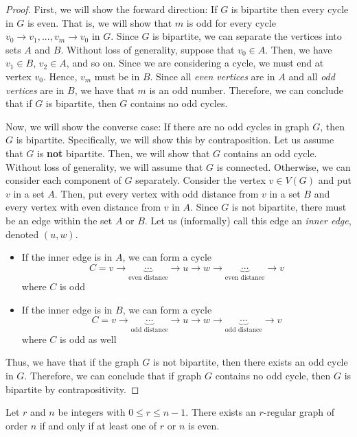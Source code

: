\begin{proof}
  First, we will show the forward direction: If \(G\) is bipartite then
  every cycle in \(G\) is even. That is, we will show that
  \(m\) is odd for every cycle \(v_0 \to
  v_1, ..., v_m \to v_0\) in \(G\). Since \(G\) is bipartite, we can separate
  the vertices into sets \(A\) and \(B\). Without loss of generality, suppose
  that \(v_0 \in A\). Then, we have \(v_1 \in B\), \(v_2 \in A\), and so on.
  Since we are considering a cycle, we must end at vertex \(v_0\). Hence,
  \(v_m\) must be in \(B\). Since all \textit{even vertices} are in \(A\) and all \textit{odd vertices} are in \(B\), we have that \(m\) is an odd number. Therefore, we can conclude that if \(G\) is bipartite, then \(G\) contains no odd cycles.

  Now, we will show the converse case: If there are no odd cycles in graph \(G\), then \(G\) is bipartite. Specifically, we will show this by contraposition. Let us assume that \(G\) is \textbf{not} bipartite. Then, we will show that \(G\) contains an odd cycle. Without loss of generality, we will assume that \(G\) is connected. Otherwise, we can consider each component of \(G\) separately. Consider the vertex \(v \in V(G)\) and put \(v\) in a set \(A\). Then, put every vertex with odd distance from \(v\) in a set \(B\) and every vertex with even distance from \(v\) in \(A\). Since \(G\) is not bipartite, there must be an edge within the set \(A\) or \(B\). Let us (informally) call this edge an \textit{inner edge}, denoted \((u, w)\).
  \begin{itemize}
    \item If the inner edge is in \(A\), we can form a cycle 
      \[ 
      C = v \to \underbrace{\cdots}_\text{even distance} \to u \to w \to \underbrace{\cdots}_\text{even distance} \to v 
    \]
      where \(C\) is odd
    \item If the inner edge is in \(B\), we can form a cycle 
      \[ 
      C = v \to \underbrace{\cdots}_\text{odd distance} \to u \to w \to \underbrace{\cdots}_\text{odd distance} \to v 
    \]
    where \(C\) is odd as well
  \end{itemize}
  Thus, we have that if the graph \(G\) is not bipartite, then there exists an
  odd cycle in \(G\). Therefore, we can conclude that if graph \(G\) contains no
  odd cycle, then \(G\) is bipartite by contrapositivity.
\end{proof}

\begin{theorem}
  Let \(r\) and \(n\) be integers with \(0 \leq r \leq n-1\). There exists an
  \(r\)-regular graph of order \(n\) if and only if at least one of \(r\) or
  \(n\) is even.
\end{theorem}

